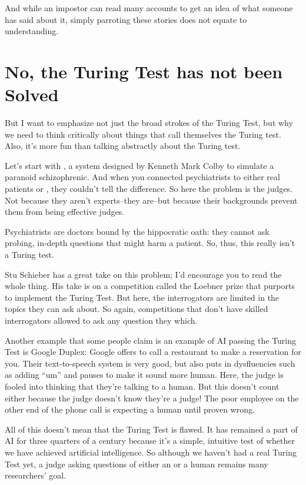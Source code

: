 And while an impostor can read many accounts to get an idea of what
someone has said about it, simply parroting these stories does not
equate to understanding.

\section{No, the Turing Test has not been Solved}
\label{sec:turing:failures}


But I want to emphasize not just the broad strokes of the Turing Test,
but why we need to think critically about things that call themselves
the Turing test.  Also, it’s more fun than talking abstractly about
the Turing test.

Let’s start with , a system designed by Kenneth Mark Colby
to simulate a paranoid schizophrenic.  And when you connected
psychiatrists to either real patients or , they couldn’t
tell the difference.  So here the problem is the judges.  Not because
they aren’t experts--they are--but because their backgrounds prevent
them from being effective judges.

Psychiatrists are doctors bound by the hippocratic oath: they cannot
ask probing, in-depth questions that might harm a patient.  So, thus,
this really isn’t a Turing test.

Stu Schieber has a great take on this problem; I’d encourage you to
read the whole thing.  His take is on a competition called the Loebner
prize that purports to implement the Turing Test.  But here, the
interrogators are limited in the topics they can ask about.  So again,
competitions that don’t have skilled interrogators allowed to ask any
question they which.


Another example that some people claim is an example of AI passing the
Turing Test is Google Duplex: Google offers to call a restaurant to
make a reservation for you.  Their text-to-speech system is very good,
but also puts in dysfluencies such as adding ``um'' and pauses to make
it sound more human.  Here, the judge is fooled into thinking that
they’re talking to a human.  But this doesn’t count either because the
judge doesn’t know they’re a judge!  The poor employee on the other
end of the phone call is expecting a human until proven wrong.

All of this doesn’t mean that the Turing Test is flawed.  It has
remained a part of AI for three quarters of a century because it’s a
simple, intuitive test of whether we have achieved artificial
intelligence.  So although we haven’t had a real Turing Test yet, a
judge asking questions of either an  or a human remains many
researchers’ goal.

